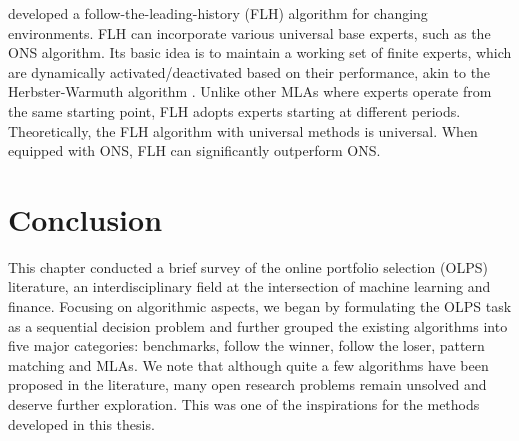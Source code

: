 \citet{hazan09} developed a follow-the-leading-history (FLH) algorithm for changing environments. FLH can incorporate various universal base experts, such as the ONS algorithm. Its basic idea is to maintain a working set of finite experts, which are dynamically activated/deactivated based on their performance, akin to the Herbster-Warmuth algorithm \citep{herbster}. Unlike other MLAs where experts operate from the same starting point, FLH adopts experts starting at different periods. Theoretically, the FLH algorithm with universal methods is universal. When equipped with ONS, FLH can significantly outperform ONS.




\section{Conclusion}
\label{sec:conclusion}

This chapter conducted a brief survey of the online portfolio selection (OLPS) literature, an interdisciplinary field at the intersection of machine learning and finance. Focusing on algorithmic aspects, we began by formulating the OLPS task as a sequential decision problem and further grouped the existing algorithms into five major categories: benchmarks, follow the winner, follow the loser, pattern matching and MLAs. We note that although quite a few algorithms have been proposed in the literature, many open research problems remain unsolved and deserve further exploration. This was one of the inspirations for the methods developed in this thesis.